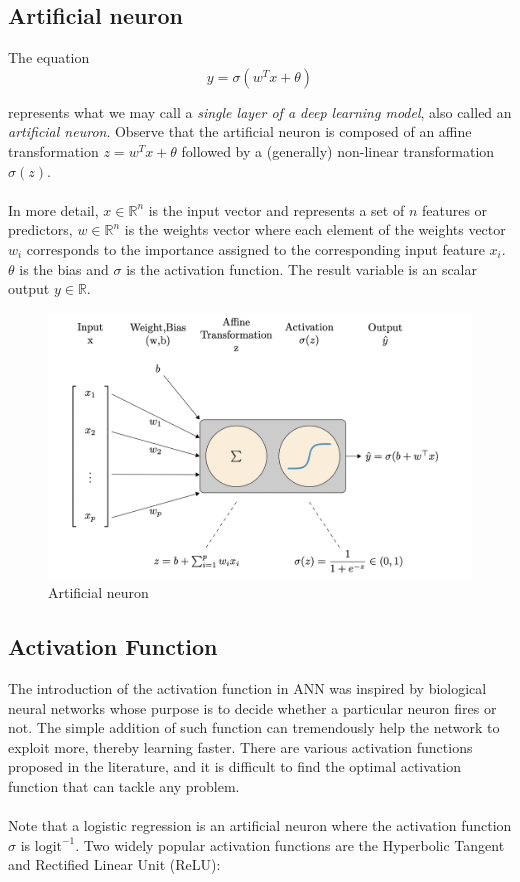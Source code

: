 \documentclass[../main.tex]{subfiles}
\begin{document}
	 \subsection{Artificial neuron}
	 \noindent The equation
	  \begin{equation}
	  	y=\sigma(w^Tx + \theta) \tag{2}
	  	\label{eq:sig}
	  \end{equation}
  
   \noindent represents what we may call a \textit{single layer of a deep learning model}, also called an \textit{artificial neuron}.  Observe that the artificial neuron is composed of an affine transformation $ z=w^Tx + \theta$ followed by a (generally) non-linear transformation $\sigma(z)$. \\ \\ In more detail, $x \in \mathbb{R}^n$ is the input vector and represents a set of $n$ features or predictors, $w\in  \mathbb{R}^n$ is the weights vector where each element of the weights vector $w_i$ corresponds to the importance assigned to the corresponding input feature $x_i$. $\theta$ is the bias and $\sigma$ is the activation function. The result variable is an scalar output $y \in \mathbb{R}$. 
 
   
   \begin{figure}[h]
   	\centering
   	\includegraphics[width=0.8\linewidth]{imgs/neu}
   	\caption{\small Artificial neuron} 
   \end{figure} \mbox{} \par
   
  
 \subsection{Activation Function}
 
 
 
 
 \noindent The introduction of the activation function in ANN was inspired by biological neural networks whose purpose is to decide whether a particular neuron fires or not. The simple addition of such function can tremendously help the network to exploit more, thereby learning faster. There are various activation functions proposed in the literature, and it is difficult to find the optimal activation function that can tackle any problem. \\ \\ 
	 	\noindent Note that a logistic regression is an artificial neuron where the activation function  $\sigma$ is $\text{logit}^{-1}$. Two widely popular activation functions are the Hyperbolic Tangent and Rectified Linear Unit (ReLU):
	 	
\end{document}

